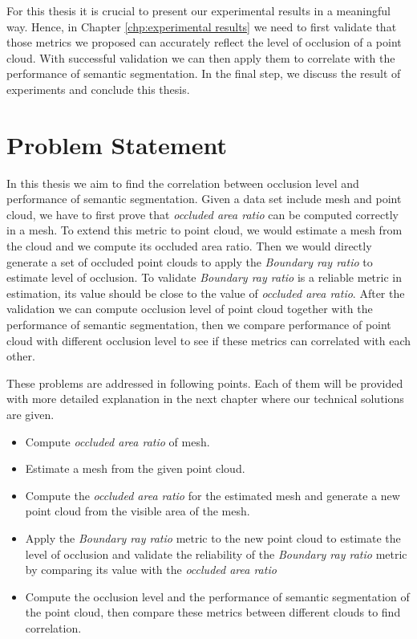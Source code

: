 \documentclass[11pt, a4paper,oneside,chapterprefix=false]{scrbook}
\begin{document}
\vspace{10pt}

For this thesis it is crucial to present our experimental results in a meaningful way. Hence, in Chapter \ref{chp:experimental results} we need to first validate that those metrics we proposed can accurately reflect the level of occlusion of a point cloud. With successful validation we can then apply them to correlate with the performance of semantic segmentation. In the final step, we discuss the result of experiments and conclude this thesis.


\chapter{Problem Statement} \label{chp:problem}

In this thesis we aim to find the correlation between occlusion level and performance of semantic segmentation. Given a data set include mesh and point cloud, we have to first prove that \emph{occluded area ratio} can be computed correctly in a mesh. To extend this metric to point cloud, we would estimate a mesh from the cloud and we compute its occluded area ratio. Then we would directly generate a set of occluded point clouds to apply the \emph{Boundary ray ratio} to estimate level of occlusion. To validate \emph{Boundary ray ratio} is a reliable metric in estimation, its value should be close to the value of \emph{occluded area ratio}. After the validation we can compute occlusion level of point cloud together with the performance of semantic segmentation, then we compare performance of point cloud with different occlusion level to see if these metrics can correlated with each other.

\vspace{10pt}

These problems are addressed in following points. Each of them will be provided with more detailed explanation in the next chapter where our technical solutions are given.

\begin{itemize}
    \item Compute \emph{occluded area ratio} of mesh.
    \item Estimate a mesh from the given point cloud.
    \item Compute the \emph{occluded area ratio} for the estimated mesh and generate a new point cloud from the visible area of the mesh.
    \item Apply the \emph{Boundary ray ratio} metric to the new point cloud to estimate the level of occlusion and validate the reliability of the \emph{Boundary ray ratio} metric by comparing its value with the \emph{occluded area ratio}
    \item Compute the occlusion level and the performance of semantic segmentation of the point cloud, then compare these metrics between different clouds to find correlation. 
\end{itemize}
\end{document}
